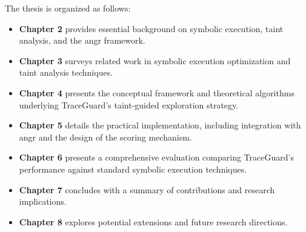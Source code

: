 The thesis is organized as follows:

\begin{itemize}
    \item \textbf{Chapter 2} provides essential background on symbolic execution, taint analysis, and the angr framework.
    \item \textbf{Chapter 3} surveys related work in symbolic execution optimization and taint analysis techniques.
    \item \textbf{Chapter 4} presents the conceptual framework and theoretical algorithms underlying TraceGuard's taint-guided exploration strategy.
    \item \textbf{Chapter 5} details the practical implementation, including integration with angr and the design of the scoring mechanism.
    \item \textbf{Chapter 6} presents a comprehensive evaluation comparing TraceGuard's performance against standard symbolic execution techniques.
    \item \textbf{Chapter 7} concludes with a summary of contributions and research implications.
    \item \textbf{Chapter 8} explores potential extensions and future research directions.
\end{itemize}
